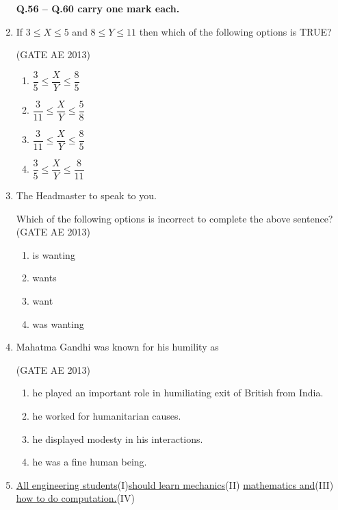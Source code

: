 \documentclass[journal,12pt,onecolumn]{IEEEtran}
\theoremstyle{remark}
\begin{document}
\begin{flushleft}
\begin{enumerate}
\textbf{Q.56 -- Q.60 carry one mark each.}
\item If $3 \leq X \leq 5$ and $8 \leq Y \leq 11$ then which of the following options is TRUE? 

\hfill(GATE AE 2013)
\begin{multicols}{2}
\begin{enumerate}
\item $\dfrac{3}{5} \leq \dfrac{X}{Y} \leq \dfrac{8}{5}$
\item $\dfrac{3}{11} \leq \dfrac{X}{Y} \leq \dfrac{5}{8}$
\item $\dfrac{3}{11} \leq \dfrac{X}{Y} \leq \dfrac{8}{5}$
\item $\dfrac{3}{5} \leq \dfrac{X}{Y} \leq \dfrac{8}{11}$
\end{enumerate}
\end{multicols}

\item The Headmaster \underline{\hspace{2cm}} to speak to you. 

Which of the following options is incorrect to complete the above sentence? 
\hfill(GATE AE 2013)
\begin{multicols}{2}
\begin{enumerate}
\item is wanting
\item wants
\item want
\item was wanting
\end{enumerate}
\end{multicols}

\item Mahatma Gandhi was known for his humility as

\hfill(GATE AE 2013)
\begin{multicols}{2}
\begin{enumerate}
\item he played an important role in humiliating exit of British from India.
\item he worked for humanitarian causes.
\item he displayed modesty in his interactions.
\item he was a fine human being.
\end{enumerate}
\end{multicols}

\item \underline{All engineering students}(I)\quad \underline{should learn mechanics}(II) \quad \underline{mathematics and}(III) \quad \underline{ how to do computation.}(IV)


\end{enumerate}
\end{flushleft}
\end{document}
